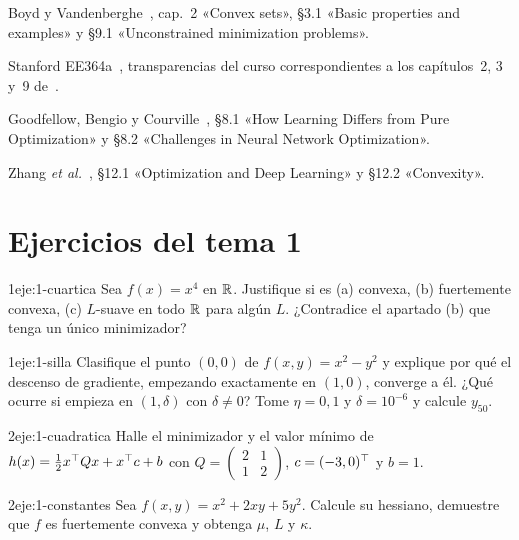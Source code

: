 \begin{lecturas}
\item Boyd y Vandenberghe~\cite{bv}, cap.~2 «Convex sets», §3.1 «Basic properties and examples» y §9.1 «Unconstrained minimization problems».
\item Stanford EE364a~\cite{ee364a}, transparencias del curso correspondientes a los capítulos~2, 3 y~9 de~\cite{bv}.
\item Goodfellow, Bengio y Courville~\cite{gbc}, §8.1 «How Learning Differs from Pure Optimization» y §8.2 «Challenges in Neural Network Optimization».
\item Zhang \emph{et al.}~\cite{d2l}, §12.1 «Optimization and Deep Learning» y §12.2 «Convexity».
\end{lecturas}

\section*{Ejercicios del tema 1}

\begin{ejercicio}{1}{eje:1-cuartica}
Sea $f(x)=x^{4}$ en $\mathbb{R}$. Justifique si es (a) convexa, (b) fuertemente convexa, (c) $L$-suave en todo $\mathbb{R}$ para algún $L$. ¿Contradice el apartado (b) que tenga un único minimizador?
\end{ejercicio}

\begin{ejercicio}{1}{eje:1-silla}
Clasifique el punto $(0,0)$ de $f(x,y)=x^{2}-y^{2}$ y explique por qué el descenso de gradiente, empezando exactamente en $(1,0)$, converge a él. ¿Qué ocurre si empieza en $(1,\delta)$ con $\delta\ne 0$? Tome $\eta=0{,}1$ y $\delta=10^{-6}$ y calcule $y_{50}$.
\end{ejercicio}

\begin{ejercicio}{2}{eje:1-cuadratica}
Halle el minimizador y el valor mínimo de $h(x)=\tfrac12x^{\top} Qx+x^{\top} c+b$ con
$Q=\begin{pmatrix}2&1\\1&2\end{pmatrix}$, $c=(-3,0)^{\top}$ y $b=1$.
\end{ejercicio}

\begin{ejercicio}{2}{eje:1-constantes}
Sea $f(x,y)=x^{2}+2xy+5y^{2}$. Calcule su hessiano, demuestre que $f$ es fuertemente convexa y obtenga $\mu$, $L$ y $\kappa$.
\end{ejercicio}

